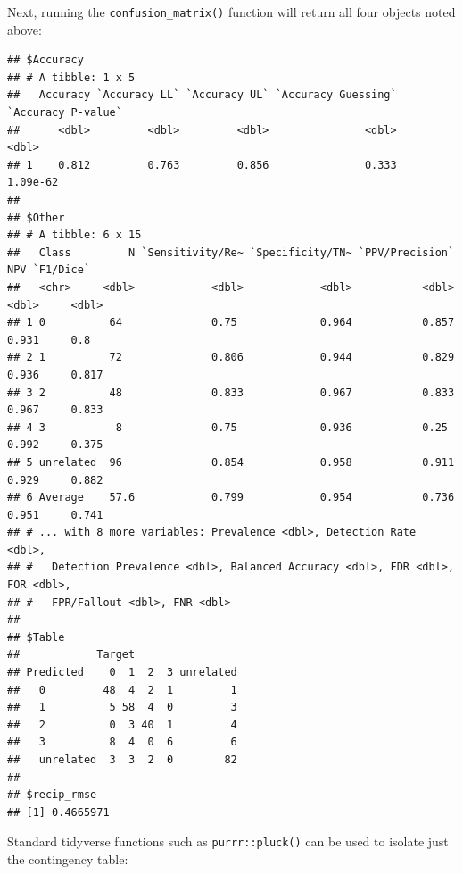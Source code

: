 \documentclass[9pt,a4paper,]{extarticle}
\newenvironment{Shaded}{\begin{snugshade}}{\end{snugshade}}
\newcommand{\AttributeTok}[1]{\textcolor[rgb]{0.77,0.63,0.00}{#1}}
\newcommand{\FunctionTok}[1]{\textcolor[rgb]{0.00,0.00,0.00}{#1}}
\newcommand{\NormalTok}[1]{#1}
\newcommand{\SpecialCharTok}[1]{\textcolor[rgb]{0.00,0.00,0.00}{#1}}
\newcommand{\StringTok}[1]{\textcolor[rgb]{0.31,0.60,0.02}{#1}}
\begin{document}
Next, running the \texttt{confusion\_matrix()} function will return all four objects noted above:

\begin{Shaded}
\end{Shaded}

\begin{verbatim}
## $Accuracy
## # A tibble: 1 x 5
##   Accuracy `Accuracy LL` `Accuracy UL` `Accuracy Guessing` `Accuracy P-value`
##      <dbl>         <dbl>         <dbl>               <dbl>              <dbl>
## 1    0.812         0.763         0.856               0.333           1.09e-62
## 
## $Other
## # A tibble: 6 x 15
##   Class         N `Sensitivity/Re~ `Specificity/TN~ `PPV/Precision`   NPV `F1/Dice`
##   <chr>     <dbl>            <dbl>            <dbl>           <dbl> <dbl>     <dbl>
## 1 0          64              0.75             0.964           0.857 0.931     0.8  
## 2 1          72              0.806            0.944           0.829 0.936     0.817
## 3 2          48              0.833            0.967           0.833 0.967     0.833
## 4 3           8              0.75             0.936           0.25  0.992     0.375
## 5 unrelated  96              0.854            0.958           0.911 0.929     0.882
## 6 Average    57.6            0.799            0.954           0.736 0.951     0.741
## # ... with 8 more variables: Prevalence <dbl>, Detection Rate <dbl>,
## #   Detection Prevalence <dbl>, Balanced Accuracy <dbl>, FDR <dbl>, FOR <dbl>,
## #   FPR/Fallout <dbl>, FNR <dbl>
## 
## $Table
##            Target
## Predicted    0  1  2  3 unrelated
##   0         48  4  2  1         1
##   1          5 58  4  0         3
##   2          0  3 40  1         4
##   3          8  4  0  6         6
##   unrelated  3  3  2  0        82
## 
## $recip_rmse
## [1] 0.4665971
\end{verbatim}

Standard tidyverse functions such as \texttt{purrr::pluck()} can be used to isolate just the contingency table:

\begin{Shaded}
\end{Shaded}
\end{document}
